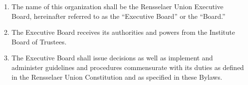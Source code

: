 \documentclass{uniondoc}
\begin{document}

\begin{enumerate}
\item The name of this organization shall be the Rensselaer Union Executive Board, hereinafter referred to as the ``Executive Board'' or the ``Board.''
\item The Executive Board receives its authorities and powers from the Institute Board of Trustees.
\item The Executive Board shall issue decisions as well as implement and administer guidelines and procedures commensurate with its duties as defined in the Rensselaer Union Constitution and as specified in these Bylaws.
\end{enumerate}

\end{document}
